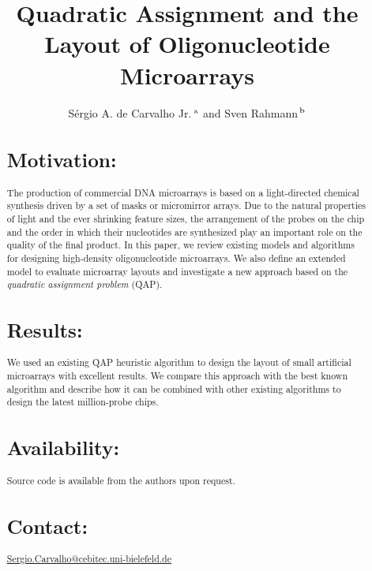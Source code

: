 \documentclass{bioinfo}
\begin{document}

\title[short Title]{Quadratic Assignment and the Layout of Oligonucleotide Microarrays}
\author[Sample \textit{et~al}]{S\'ergio A. de Carvalho Jr.\,$^{\rm a}$ and Sven Rahmann\,$^{\rm b}$}
\address{$^{\rm a}$Graduiertenkolleg Bioinformatik, Bielefeld University, Germany,\\$^{\rm b}$Algorithms and Statistics for Systems Biology, Genome Informatics, Bielefeld University, Germany.}
\maketitle

\begin{abstract}

\section{Motivation:}
The production of commercial DNA microarrays is based on a light-directed chemical synthesis driven by a set of masks or micromirror arrays. Due to the natural properties of light and the ever shrinking feature sizes, the arrangement of the probes on the chip and the order in which their nucleotides are synthesized play an important role on the quality of the final product. In this paper, we review existing models and algorithms for designing high-density oligonucleotide microarrays. We also define an extended model to evaluate microarray layouts and investigate a new approach based on the \emph{quadratic assignment problem} (QAP).
\section{Results:}
We used an existing QAP heuristic algorithm to design the layout of small artificial microarrays with excellent results. We compare this approach with the best known algorithm and describe how it can be combined with other existing algorithms to design the latest million-probe chips.
\section{Availability:}
Source code is available from the authors upon request.
\section{Contact:} \href{Sergio.Carvalho@cebitec.uni-bielefeld.de}{Sergio.Carvalho@cebitec.uni-bielefeld.de}
\end{abstract}
\end{document}
